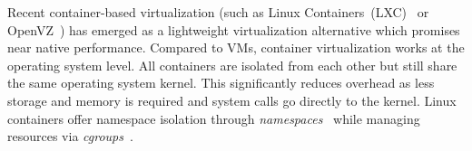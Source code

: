 %
%
%
%
%
%
%
%
%


Recent container-based virtualization (such as Linux Containers~(LXC)~\cite{xxx} or
OpenVZ~\cite{bibid}) has emerged as a lightweight virtualization alternative
which promises near native performance.
%
Compared to VMs, container virtualization works at the
operating system level. %
%
All containers are isolated from each other but still share the same operating
system kernel. This significantly reduces overhead as less storage and memory is
required and system calls go directly to the kernel. 
%
Linux containers offer namespace isolation through
\textit{namespaces}~\cite{linux-namespaces}
while managing resources via \textit{cgroups}~\cite{linux-cgroups}.


%
%


